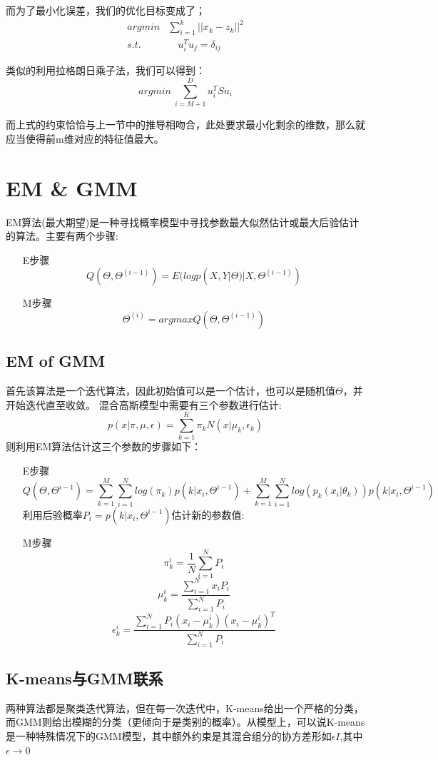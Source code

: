 \documentclass[UTF8]{ctexart}
\begin{document}
而为了最小化误差，我们的优化目标变成了；
\begin{equation}
    \begin{aligned}
    argmin &\sum^k_{i=1}||x_k-z_k||^2 \\
    s.t. &\quad u_i^Tu_j=\delta_{ij}
    \end{aligned}
\end{equation}

类似的利用拉格朗日乘子法，我们可以得到：
\begin{equation}
    argmin \ \sum_{i=M+1}^Du^T_iSu_i 
\end{equation}

而上式的约束恰恰与上一节中的推导相吻合，此处要求最小化剩余的维数，那么就应当使得前m维对应的特征值最大。
\section{EM \& GMM}
EM算法(最大期望)是一种寻找概率模型中寻找参数最大似然估计或最大后验估计的算法。主要有两个步骤:

\begin{itemize}
    \item[E步骤] $$Q(\Theta,\Theta^{(i-1)}) = E(logp(X,Y|\Theta)|X,\Theta^{(i-1)})$$
    \item[M步骤]$$\Theta^{(i)} = argmaxQ(\Theta,\Theta^{(i-1)}) $$
\end{itemize}
\subsection{EM of GMM}
首先该算法是一个迭代算法，因此初始值可以是一个估计，也可以是随机值$\Theta$，并开始迭代直至收敛。
混合高斯模型中需要有三个参数进行估计:
\begin{equation}
    p(x|\pi,\mu,\epsilon)=\sum^K_{k=1}\pi_kN(x|\mu_k,\epsilon_k)
\end{equation}
则利用EM算法估计这三个参数的步骤如下：
\begin{itemize}
    \item[E步骤]
$$Q(\Theta,\Theta^{i-1})=\sum^M_{k=1}\sum^N_{i=1}log(\pi_k)p(k|x_i,\Theta^{i-1})+\sum^M_{k=1}\sum^N_{i=1}log(p_k(x_i|\theta_k))p(k|x_i,\Theta^{i-1})$$ 
利用后验概率$P_i = p(k|x_i,\Theta^{i-1})$估计新的参数值:
    \item[M步骤]
$$\pi_k^i=\frac{1}{N}\sum^N_{i=1}P_i$$
$$\mu^i_k=\frac{\sum^N_{i=1}x_iP_i}{\sum^N_{i=1}P_i}$$
$$\epsilon^i_k=\frac{\sum^N_{i=1}P_i(x_i-\mu^i_k)(x_i-\mu^i_k)^T}{\sum^N_{i=1}P_i}$$ 
\end{itemize}

\subsection{K-means与GMM联系}
两种算法都是聚类迭代算法，但在每一次迭代中，K-means给出一个严格的分类，而GMM则给出模糊的分类（更倾向于是类别的概率）。从模型上，可以说K-means是一种特殊情况下的GMM模型，其中额外约束是其混合组分的协方差形如$\epsilon I$,其中$\epsilon \rightarrow 0$
\end{document}
